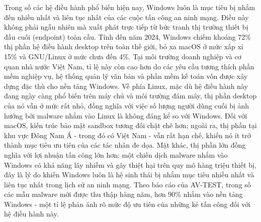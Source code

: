 Trong số các hệ điều hành phổ biến hiện nay, Windows luôn là mục tiêu bị
nhắm đến nhiều nhất và liên tục nhất của các cuộc tấn công an ninh mạng.
Điều này không phải ngẫu nhiên mà xuất phát trực tiếp từ bức tranh thị
trường thiết bị đầu cuối (endpoint) toàn cầu. Tính
đến năm 2024, Windows chiếm khoảng 72\% thị phần hệ điều hành desktop trên toàn
thế giới, \cite{statcounter2024} bỏ xa macOS ở mức xấp xỉ 15\% và GNU/Linux
ở mức chưa đến 4\%. \cite{statcounter2024} Tại môi trường doanh nghiệp và cơ
quan nhà nước Việt Nam, tỉ lệ này còn cao hơn do các yêu cầu tương thích phần
mềm nghiệp vụ, hệ thống quản lý văn bản và phần mềm kế toán vốn được xây dựng
đặc thù cho nền tảng Windows. Về phía Linux, mặc dù hệ điều hành này đang ngày
càng phổ biến trên máy chủ và môi trường đám mây, thị phần desktop của nó vẫn
ở mức rất nhỏ, đồng nghĩa với việc số lượng người dùng cuối bị ảnh hưởng bởi
malware nhắm vào Linux là không đáng kể so với Windows. Đối với macOS,
kiến trúc bảo mật sandbox tương đối chặt chẽ hơn; ngoài ra, thị phần tại khu vực Đông Nam
Á - trong đó có Việt Nam - vẫn rất hạn chế, khiến nó ít trở thành mục tiêu
ưu tiên của các tác nhân đe dọa. Mặt khác, thị phần lớn đồng nghĩa với lợi
nhuận tấn công lớn hơn: một chiến dịch malware nhắm vào Windows có khả năng
lây nhiễm và gây thiệt hại trên quy mô hàng triệu thiết bị, đây là lý do khiến
Windows luôn là hệ sinh thái bị nhắm mục tiêu nhiều nhất và liên tục nhất trong
lịch sử an ninh mạng. Theo báo cáo của AV-TEST, trong số các mẫu malware mới
được thu thập hàng năm, hơn 90\% nhắm vào nền tảng Windows \cite{avtestmalwarestats} - một
tỉ lệ phản ánh rõ mức độ ưu tiên của những kẻ tấn công đối với hệ
điều hành này.

